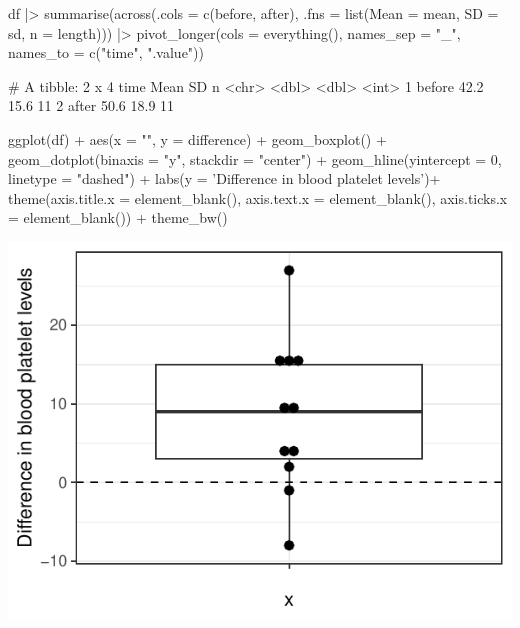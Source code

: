 \documentclass[a4paper]{article}
\begin{document}
\begin{Schunk}
\begin{Sinput}
df |>
summarise(across(.cols = c(before, after), 
  .fns = list(Mean = mean, 
  SD = sd, 
  n = length))) |> 
pivot_longer(cols = everything(),
  names_sep = "_",
  names_to = c("time", ".value"))
\end{Sinput}
\begin{Soutput}
# A tibble: 2 x 4
  time    Mean    SD     n
  <chr>  <dbl> <dbl> <int>
1 before  42.2  15.6    11
2 after   50.6  18.9    11
\end{Soutput}
\begin{Sinput}
ggplot(df) +
aes(x = "", y = difference) + 
geom_boxplot() +
geom_dotplot(binaxis = "y", stackdir = "center") +
geom_hline(yintercept = 0, linetype = "dashed") +
labs(y = 'Difference in blood platelet levels')+
theme(axis.title.x = element_blank(),
  axis.text.x = element_blank(),
  axis.ticks.x = element_blank()) + 
theme_bw()
\end{Sinput}


{\centering \includegraphics[width=\maxwidth]{figure/listings-unnamed-chunk-66-1} 

}

\end{Schunk}
\end{document}
